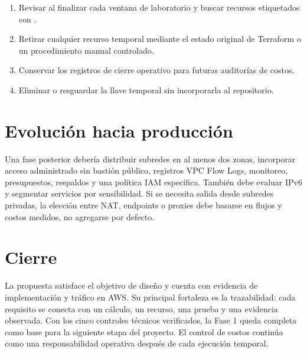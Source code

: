 \begin{enumerate}\small
  \item Revisar  al finalizar cada ventana de laboratorio y buscar recursos etiquetados con .
  \item Retirar cualquier recurso temporal mediante el estado original de Terraform o un procedimiento manual controlado.
  \item Conservar los registros de cierre operativo para futuras auditorías de costos.
  \item Eliminar o resguardar la llave temporal sin incorporarla al repositorio.
\end{enumerate}

\section{Evolución hacia producción}

Una fase posterior debería distribuir subredes en al menos dos zonas, incorporar acceso administrado sin bastión público, registros VPC Flow Logs, monitoreo, presupuestos, respaldos y una política IAM específica. También debe evaluar IPv6 y segmentar servicios por sensibilidad. Si se necesita salida desde subredes privadas, la elección entre NAT, endpoints o proxies debe basarse en flujos y costos medidos, no agregarse por defecto.

\section{Cierre}

La propuesta satisface el objetivo de diseño y cuenta con evidencia de implementación y tráfico en AWS. Su principal fortaleza es la trazabilidad: cada requisito se conecta con un cálculo, un recurso, una prueba y una evidencia observada. Con los cinco controles técnicos verificados, la Fase 1 queda completa como base para la siguiente etapa del proyecto. El control de costos continúa como una responsabilidad operativa después de cada ejecución temporal.
